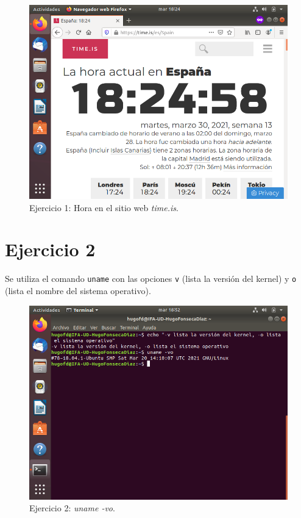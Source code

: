 \documentclass[11pt]{article}
\begin{document}
\begin{figure}[H]
    \caption{Ejercicio 1: Hora en el sitio web \textit{time.is}.}
  \centering
  \includegraphics{e1-2.png}
\end{figure}

\section{Ejercicio 2}
Se utiliza el comando \verb|uname| con las opciones \verb|v| (lista la versión del kernel) y \verb|o| (lista el nombre del sistema operativo).

\begin{figure}[H]
    \caption{Ejercicio 2: \textit{uname -vo}.}
  \centering
  \includegraphics{e2.png}
\end{figure}
\end{document}
